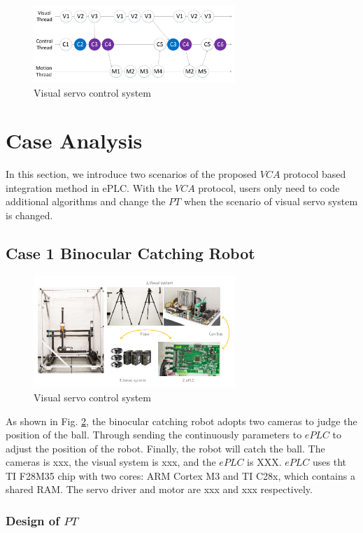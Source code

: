 \documentclass[journal,UTF8]{IEEEtran}
\begin{document}
\begin{figure}
	\centering
	\includegraphics[width=3in]{fig/ThreadExecution.pdf}
	\caption{ Visual servo control system}
	\label{fig:threadExecution}
\end{figure}

\section{Case Analysis}
\label{Case}
In this section, we introduce two scenarios of the proposed $VCA$ protocol based integration method in ePLC. With the $VCA$ protocol, users only need to code additional algorithms and change the $PT$ when the scenario of visual servo system is changed. 
\subsection{Case 1 Binocular Catching Robot}
\begin{figure}
	\centering
	\includegraphics[width=3in]{fig/robot.pdf}
	\caption{ Visual servo control system}
	\label{fig:robot}
\end{figure}
As shown in Fig. \ref{fig:robot}, the binocular catching robot adopts two cameras to judge the position of the ball. Through sending the continuously parameters to $ePLC$ to adjust the position of the robot. Finally, the robot will catch the ball. The cameras is xxx, the visual system is xxx, and the $ePLC$ is XXX. $ePLC$ uses tht TI F28M35 chip with two cores: ARM Cortex M3 and TI C28x, which contains a shared RAM. The servo driver and motor are xxx and xxx respectively. 
\subsubsection{Design of $PT$}
\end{document}
